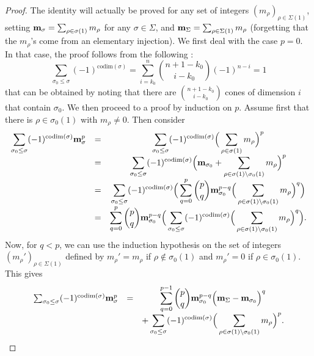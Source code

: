 \documentclass[10pt,a4paper]{amsart}
\def\codim{\mathrm{codim}}
\def\um{{\bf m}}
\begin{document}
 \begin{proof}
 The identity will actually be proved for any set of integers $(m_\rho)_{\rho\in\Sigma(1)}$, setting 
 $\um_\sigma=\sum_{\rho\in\sigma(1)}m_\rho$ for any $\sigma\in\Sigma$, and $\um_\Sigma=\sum_{\rho\in\Sigma(1)} m_\rho$ (forgetting that the $m_\rho$'s come from an elementary injection). 
  We first deal with the case $p=0$. In that case, the proof follows from the following :
  $$
  \sum_{\sigma_0\leq\sigma} (-1)^{\codim(\sigma)}=\sum_{i=k_0}^n\binom{n+1-k_0}{i-k_0}(-1)^{n-i}=1
  $$
  that can be obtained by noting that there are $\binom{n+1-k_0}{i-k_0}$ cones of dimension $i$ that contain $\sigma_0$. 
 We then proceed to a proof by induction on $p$. Assume first that there is $\rho\in\sigma_0(1)$ with $m_\rho\neq 0$. Then consider
 $$
 \begin{array}{ccc}
 \displaystyle \sum_{\sigma_0\leq\sigma} (-1)^{\codim(\sigma)}\um_\sigma^p & = &\displaystyle\sum_{\sigma_0\leq\sigma} (-1)^{\codim(\sigma)}\Big(\sum_{\rho\in\sigma(1)}m_\rho\Big)^p\\
    & = &\displaystyle\sum_{\sigma_0\leq\sigma} (-1)^{\codim(\sigma)}\Big(\um_{\sigma_0}+\sum_{\rho\in\sigma(1)\setminus\sigma_0(1)}m_\rho\Big)^p\\
     & = &\displaystyle\sum_{\sigma_0\leq\sigma} (-1)^{\codim(\sigma)} \Big(\sum_{q=0}^p \binom{p}{q} \um_{\sigma_0}^{p-q}\Big(\sum_{\rho\in\sigma(1)\setminus\sigma_0(1)}m_\rho\Big)^q \Big)\\
        & = &\displaystyle \sum_{q=0}^p \binom{p}{q}\um_{\sigma_0}^{p-q}\Big(\sum_{\sigma_0\leq\sigma} (-1)^{\codim(\sigma)} \Big(\sum_{\rho\in\sigma(1)\setminus\sigma_0(1)}m_\rho\Big)^q \Big).
 \end{array}
 $$
 Now, for $q<p$, we can use the induction hypothesis on the set of integers $(m_\rho')_{\rho\in\Sigma(1)}$ defined by $m_\rho'=m_\rho$ if $\rho\notin\sigma_0(1)$ and $m_\rho'=0$ if $\rho\in\sigma_0(1)$. This gives
 $$
 \begin{array}{ccc}
 \sum_{\sigma_0\leq\sigma} (-1)^{\codim(\sigma)}\um_\sigma^p & = & \displaystyle \sum_{q=0}^{p-1} \binom{p}{q}\um_{\sigma_0}^{p-q}\Big(\um_\Sigma-\um_{\sigma_0}\Big)^q\\
 & & \displaystyle+\sum_{\sigma_0\leq\sigma} (-1)^{\codim(\sigma)} \Big(\sum_{\rho\in\sigma(1)\setminus\sigma_0(1)}m_\rho\Big)^p .

\end{array}$$
\end{proof}
\end{document}
